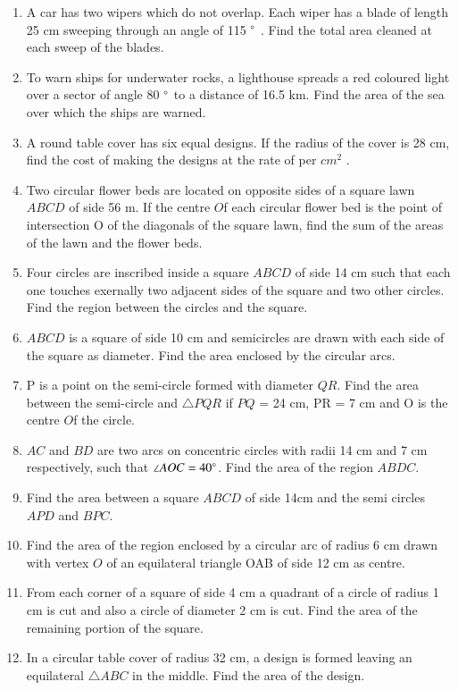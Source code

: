 \begin{enumerate}[label=\arabic*.,ref=\thesubsection.\theenumi]
\item A car has two wipers which do not overlap. Each wiper has a blade of length 25 cm sweeping through an angle of 115 $\degree$ . Find the total area cleaned at each sweep of the blades.
\item  To warn ships for underwater rocks, a lighthouse spreads a red coloured light over a sector of angle 80 $\degree$  to a distance of 16.5 km. Find the area of the sea over which the ships are warned.
\item  A round table cover has six equal designs. If the radius of the cover is 28 cm, find the cost of making the designs at the rate of  per $cm^2$
. 
%
\item Two circular flower beds are located on opposite sides of a square lawn $ABCD$ of side 56 m. If the centre $O$f each circular flower bed is the point of intersection O of the diagonals of the square lawn, find the sum of the areas of the lawn and the flower beds.
%
\item Four circles are inscribed  inside a square $ABCD$ of side 14 cm such that each one touches exernally two adjacent sides of the square and two  other circles.  Find the region between the circles and the square.
\item  $ABCD$ is a square of side 10 cm and semicircles are drawn with each side of the square as diameter. Find the area enclosed by the circular arcs.
%
\item P is a point on the semi-circle formed with diameter $QR$. Find the area between the semi-circle and $\triangle PQR$ if $PQ$ = 24 cm, PR = 7 cm and O is the centre $O$f the circle.
\item $AC$ and $BD$ are two arcs on concentric circles with radii 14 cm and 7 cm respectively, such that $\angle AOC = 40\degree$.  Find the area of the region $ABDC$.
%
\item Find the area between a square $ABCD$ of side 14cm and the semi circles $APD$ and $BPC$.
\item Find the area of the  region enclosed by  a circular arc of radius 6 cm drawn with vertex $O$ of an equilateral triangle OAB of side 12 cm as centre.
%
\item From each corner of a square of side 4 cm a quadrant of a circle of radius 1 cm is cut and also a circle of diameter 2 cm is cut. Find the area of the remaining portion of the square.\item In a circular table cover of radius 32 cm, a design is formed leaving an equilateral $\triangle ABC$ in the middle. Find the area of the design.

\end{enumerate}
